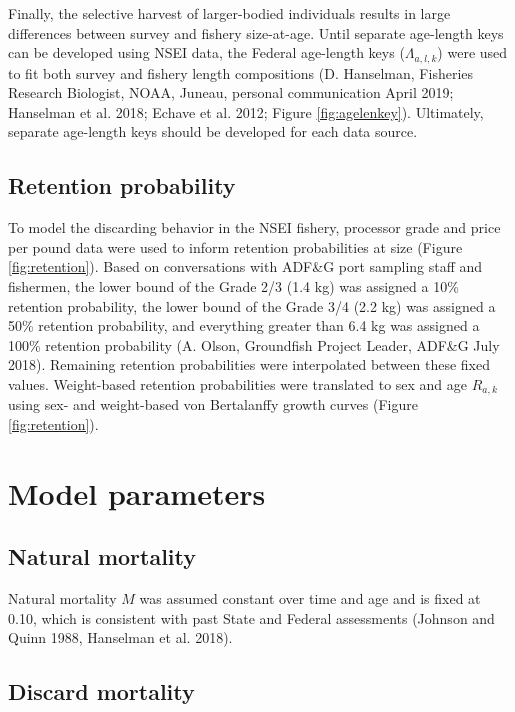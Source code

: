 \documentclass[]{article}
\begin{document}
Finally, the selective harvest of larger-bodied individuals results in
large differences between survey and fishery size-at-age. Until separate
age-length keys can be developed using NSEI data, the Federal age-length
keys (\(\Lambda_{a,l,k}\)) were used to fit both survey and fishery
length compositions (D. Hanselman, Fisheries Research Biologist, NOAA,
Juneau, personal communication April 2019; Hanselman et al. 2018; Echave
et al. 2012; Figure \ref{fig:agelenkey}). Ultimately, separate
age-length keys should be developed for each data source.

\subsection{Retention probability}\label{retention-probability}

To model the discarding behavior in the NSEI fishery, processor grade
and price per pound data were used to inform retention probabilities at
size (Figure \ref{fig:retention}). Based on conversations with ADF\&G
port sampling staff and fishermen, the lower bound of the Grade 2/3 (1.4
kg) was assigned a 10\% retention probability, the lower bound of the
Grade 3/4 (2.2 kg) was assigned a 50\% retention probability, and
everything greater than 6.4 kg was assigned a 100\% retention
probability (A. Olson, Groundfish Project Leader, ADF\&G July 2018).
Remaining retention probabilities were interpolated between these fixed
values. Weight-based retention probabilities were translated to sex and
age \(R_{a,k}\) using sex- and weight-based von Bertalanffy growth
curves (Figure \ref{fig:retention}).

\section{Model parameters}\label{model-parameters}

\subsection{Natural mortality}\label{natural-mortality}

Natural mortality \(M\) was assumed constant over time and age and is
fixed at 0.10, which is consistent with past State and Federal
assessments (Johnson and Quinn 1988, Hanselman et al. 2018).

\subsection{Discard mortality}\label{discard-mortality}
\end{document}

